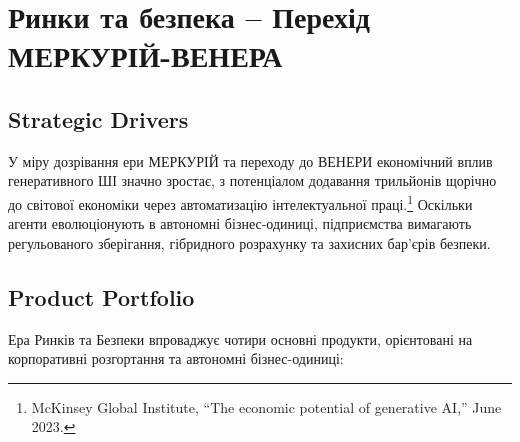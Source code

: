 \documentclass[11pt]{article}
\begin{document}
\section{Ринки та безпека -- Перехід МЕРКУРІЙ-ВЕНЕРА}
\subsection{Strategic Drivers}
У міру дозрівання ери МЕРКУРІЙ та переходу до ВЕНЕРИ економічний вплив генеративного ШІ значно зростає, з потенціалом додавання трильйонів щорічно до світової економіки через автоматизацію інтелектуальної праці.\footnote{McKinsey Global Institute, ``The economic potential of generative AI,'' June 2023.} Оскільки агенти еволюціонують в автономні бізнес-одиниці, підприємства вимагають регульованого зберігання, гібридного розрахунку та захисних бар'єрів безпеки.

\subsection{Product Portfolio}
Ера Ринків та Безпеки впроваджує чотири основні продукти, орієнтовані на корпоративні розгортання та автономні бізнес-одиниці:
\end{document}

